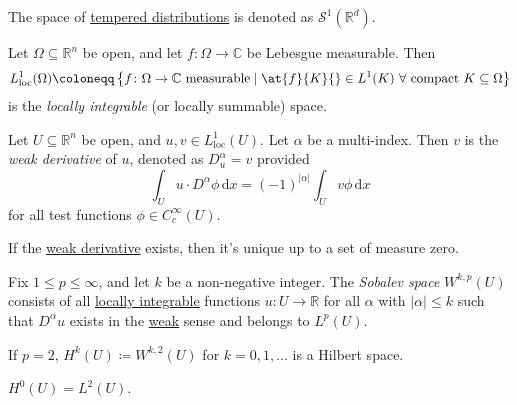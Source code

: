 \begin{notation}
	The space of \hyperref[def:tempered-distribution]{tempered distributions} is denoted as \(\mathcal{S} ^1(\mathbb{R} ^d)\).
\end{notation}

\begin{definition}\label{def:locally-integrable}
	Let \(\Omega \subseteq \mathbb{R} ^n\) be open, and let \(f\colon \Omega \to \mathbb{C} \) be Lebesgue measurable. Then
	\[
		L^1_{\text{loc} }(\Omega ) \coloneqq \left\{ f\colon \Omega \to \mathbb{C} \text{ measurable} \mid \at{f}{K}{} \in L^1(K)\ \forall \text{ compact } K \subseteq \Omega \right\}
	\]
	is the \emph{locally integrable} (or locally summable) space.
\end{definition}

\begin{definition}\label{def:weak-derivative}
	Let \(U \subseteq \mathbb{R} ^n\) be open, and \(u, v\in L^1_{\text{loc} }(U)\). Let \(\alpha\) be a multi-index. Then \(v\) is the \emph{weak derivative} of \(u\), denoted as \(D^\alpha _u = v\) provided
	\[
		\int _U u\cdot D^\alpha \phi \,\mathrm{d} x = (-1)^{\vert \alpha \vert} \int _U v \phi \,\mathrm{d} x
	\]
	for all test functions \(\phi \in C^{\infty} _c(U)\).
\end{definition}

\begin{remark}
	If the \hyperref[def:weak-derivative]{weak derivative} exists, then it's unique up to a set of measure zero.
\end{remark}

\begin{definition}\label{def:Sobalev-space}
	Fix \(1 \leq p \leq \infty \), and let \(k\) be a non-negative integer. The \emph{Sobalev space} \(W^{k, p}(U)\) consists of all \hyperref[def:locally-integrable]{locally integrable} functions \(u\colon U \to \mathbb{R} \) for all \(\alpha \) with \(\vert \alpha \vert \leq k\) such that \(D^\alpha u\) exists in the \hyperref[def:weak-derivative]{weak} sense and belongs to \(L^p(U)\).
\end{definition}

\begin{remark}
	If \(p = 2\), \(H^k(U) \coloneqq W^{k, 2}(U)\) for \(k = 0, 1, \ldots \) is a Hilbert space.
\end{remark}

\begin{eg}
	\(H^0(U) = L^2(U)\).
\end{eg}

